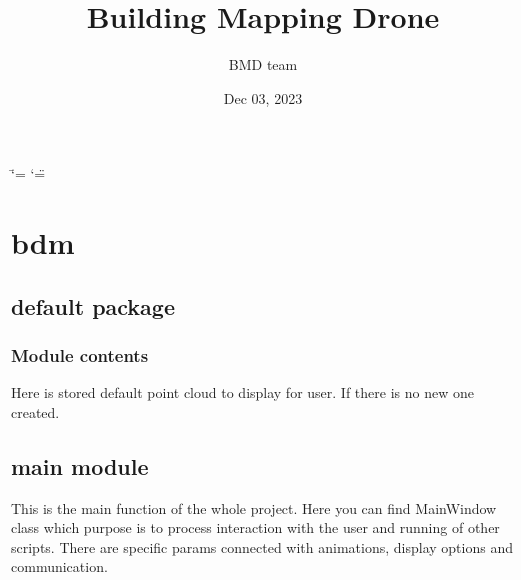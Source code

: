 \documentclass[letterpaper,10pt,english]{sphinxmanual}
\title{Building Mapping Drone}
\date{Dec 03, 2023}
\author{BMD team}
\begin{document}
\ifdefined\shorthandoff
  \ifnum\catcode`\=\string=\active\shorthandoff{=}\fi
  \ifnum\catcode`\"=\active{}\fi
\fi

\pagestyle{empty}
\sphinxmaketitle
\pagestyle{plain}
\sphinxtableofcontents
\pagestyle{normal}
\label{\detokenize{index::doc}}


\sphinxstepscope


\chapter{bdm}
\label{\detokenize{modules:bdm}}\label{\detokenize{modules::doc}}
\sphinxstepscope


\section{default package}
\label{\detokenize{default:default-package}}\label{\detokenize{default::doc}}

\subsection{Module contents}
\label{\detokenize{default:module-default}}\label{\detokenize{default:module-contents}}
\sphinxAtStartPar
Here is stored default point cloud to display for user. If there is no new one created.

\sphinxstepscope


\section{main module}
\label{\detokenize{main:module-main}}\label{\detokenize{main:main-module}}\label{\detokenize{main::doc}}
\sphinxAtStartPar
This is the main function of the whole project. Here you can find MainWindow class which purpose is to process
interaction with the user and running of other scripts. There are specific params connected with animations,
display options and communication.
\end{document}
